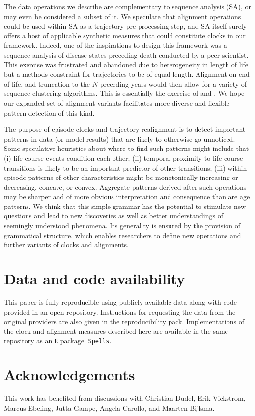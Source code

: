 \documentclass[a4paper,left=1.25cm,right=1.25cm,top=1.25cm,bottom=1.25cm]{article}
\begin{document}
The data operations we describe are complementary to sequence analysis (SA), or may even be considered a subset of it. We speculate that alignment operations could be used within SA as a trajectory pre-processing step, and SA itself surely offers a host of applicable synthetic measures that could constitute clocks in our framework. Indeed, one of the inspirations to design this framework was a sequence analysis of disease states preceding death conducted by a peer scientist. This exercise was frustrated and abandoned due to heterogeneity in length of life but a methods constraint for trajectories to be of equal length. Alignment on end of life, and truncation to the $N$ preceding years would then allow for a variety of sequence clustering algorithms. This is essentially the exercise of \citet{potente2018disability} and \citet{raab2018pathways}. We hope our expanded set of alignment variants facilitates more diverse and flexible pattern detection of this kind.

The purpose of episode clocks and trajectory realignment is to detect important patterns in data (or model results) that are likely to otherwise go unnoticed. Some speculative heuristics about where to find such patterns might include that (i) life course events condition each other; (ii) temporal proximity to life course transitions is likely to be an important predictor of other transitions; (iii) within-episode patterns of other characteristics might be monotonically increasing or decreasing, concave, or convex. Aggregate patterns derived after such operations may be sharper and of more obvious interpretation and consequence than are age patterns. We think that this simple grammar has the potential to stimulate new questions and lead to new discoveries as well as better understandings of seemingly understood phenomena. Its generality is ensured by the provision of grammatical structure, which enables researchers to define new operations and further variants of clocks and alignments.

\section*{Data and code availability}
This paper is fully reproducible using publicly available data along with code provided in an open repository. Instructions for requesting the data from the original providers are also given in the reproducibility pack. Implementations of the clock and alignment measures described here are available in the same repository as an \texttt{R} package, \texttt{Spells}.

\section*{Acknowledgements}
This work has benefited from discussions with Christian Dudel, Erik Vickstrom, Marcus Ebeling, Jutta Gampe, Angela Carollo, and Maarten Bijlsma. 

\FloatBarrier
\singlespacing

   
\end{document}

